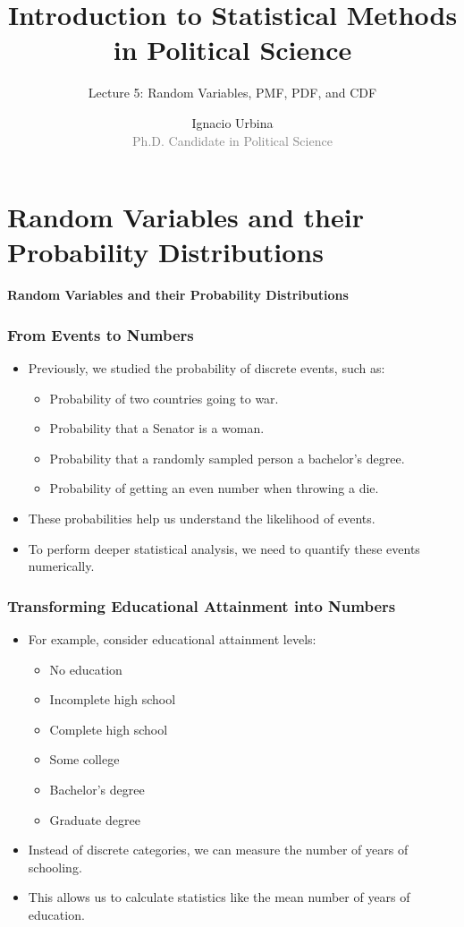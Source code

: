 \documentclass[handout]{beamer} %
\title{Introduction to Statistical Methods in Political Science}
\subtitle{Lecture 5: Random Variables, PMF, PDF, and CDF}
\author{Ignacio Urbina \texorpdfstring{\\ \vspace{0.3em}}{ } \scriptsize \textcolor{gray}{Ph.D. Candidate in Political Science}}
\date{}
\newcommand{\transitionslide}[1]{
    \begin{frame}[plain]
        \centering
        \vspace{1cm}
        \Huge
        \textcolor{moonstoneblue!150}{\textbf{#1}}
    \end{frame}
}
\begin{document}
\frame{\titlepage}

\section{Random Variables and their Probability Distributions}
\transitionslide{Random Variables and their Probability Distributions}

\begin{frame}
    \frametitle{From Events to Numbers}
    \begin{itemize}
        \item Previously, we studied the probability of discrete events, such as: \pause
        \begin{itemize}
            \item Probability of two countries going to war. \pause
            \item Probability that a Senator is a woman. \pause
            \item Probability that a randomly sampled person a bachelor's degree. \pause
            \item Probability of getting an even number when throwing a die.  \pause
        \end{itemize}
        \item These probabilities help us understand the likelihood of events. \pause
        \item To perform deeper statistical analysis, we need to quantify these events numerically. 
    \end{itemize}
\end{frame}

\begin{frame}
    \frametitle{Transforming Educational Attainment into Numbers}
    \begin{itemize}
        \item For example, consider educational attainment levels: \pause
        \begin{itemize}
            \item No education \pause
            \item Incomplete high school \pause
            \item Complete high school \pause
            \item Some college \pause
            \item Bachelor's degree \pause
            \item Graduate degree \pause
        \end{itemize}
        \item Instead of discrete categories, we can measure the number of years of schooling. \pause
        \item This allows us to calculate statistics like the mean number of years of education. 
    \end{itemize}
\end{frame}
\end{document}
